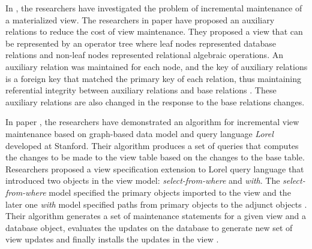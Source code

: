 \documentclass[11pt,a4paper,bibtotoc,idxtotoc,headsepline,footsepline,footexclude,BCOR12mm,DIV13]{scrbook}
\begin{document}
In \cite{incremental:materializedviews}, the researchers have investigated the problem of incremental maintenance of a materialized view. The researchers in paper \cite{incremental:materializedviews} have proposed an auxiliary relations to reduce the cost of view maintenance. They proposed a view that can be represented by an operator tree \cite{database:concepts} where leaf nodes represented database relations and non-leaf nodes represented relational algebraic operations. An auxiliary relation was maintained for each node, and the key of auxiliary relations is a foreign key that matched the primary key of each relation, thus maintaining referential integrity between auxiliary relations and base relations \cite{database:concepts}. These auxiliary relations are also changed in the response to the base relations changes.

In paper \cite{incrementalmaintenance:materializedviews}, the researchers have demonstrated an algorithm for incremental view maintenance based on graph-based data model and query language \emph{Lorel} developed at Stanford. Their algorithm produces a set of queries that computes the changes to be made to the view table based on the changes to the base table. Researchers proposed a view specification extension to Lorel query language \cite{incrementalmaintenance:materializedviews} that introduced two objects in the view model: \emph{select-from-where} and \emph{with}. The \emph{select-from-where} model specified the primary objects imported to the view and the later one \emph{with} model specified paths from primary objects to the adjunct objects \cite{incrementalmaintenance:materializedviews}. Their algorithm generates a set of maintenance statements for a given view and a database object, evaluates the updates on the database to generate new set of view updates and finally installs the updates in the view \cite{incrementalmaintenance:materializedviews}.
\end{document}
